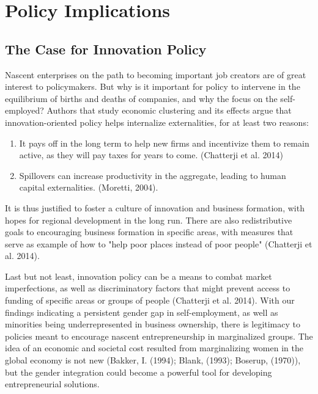 \chapter{Policy Implications\label{ch:policy}}

\section{The Case for Innovation Policy}

Nascent enterprises on the path to becoming important job creators are of great interest to policymakers. But why is it important for policy to intervene in the equilibrium of births and deaths of companies, and why the focus on the self-employed? Authors that study economic clustering and its effects argue that innovation-oriented policy helps internalize externalities, for at least two reasons: 

\renewcommand{\labelenumi}{\roman{enumi}}
\begin{enumerate}
\item It pays off in the long term to help new firms and incentivize them to remain active, as they will pay taxes for years to come. (Chatterji et al. 2014) 
\item Spillovers can increase productivity in the aggregate, leading to human capital externalities. (Moretti, 2004). 
\end{enumerate}

It is thus justified to foster a culture of innovation and business formation, with hopes for regional development in the long run. There are also redistributive goals to encouraging business formation in specific areas, with measures that serve as example of how to "help poor places instead of poor people" (Chatterji et al. 2014). 

Last but not least, innovation policy can be a means to combat market imperfections, as well as discriminatory factors that might prevent access to funding of specific areas or groups of people (Chatterji et al. 2014). With our findings indicating a persistent gender gap in self-employment, as well as minorities being underrepresented in business ownership, there is legitimacy to policies meant to encourage nascent entrepreneurship in marginalized groups. The idea of an economic and societal cost resulted from marginalizing women in the global economy is not new (Bakker, I. (1994); Blank, (1993); Boserup, (1970)), but the  gender integration could become a powerful tool for developing entrepreneurial solutions.  

